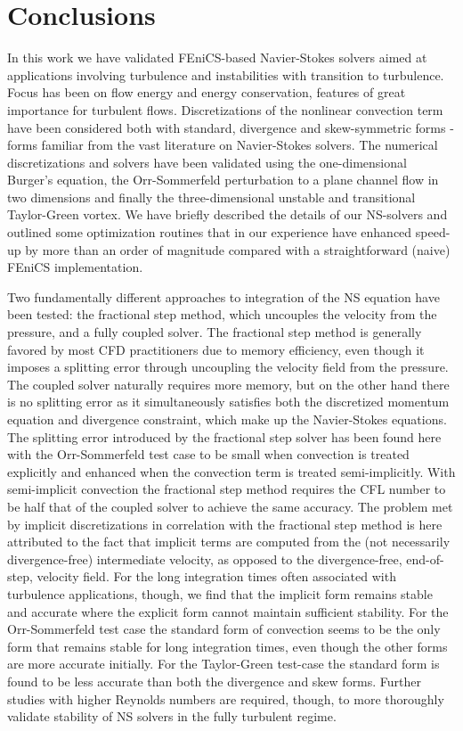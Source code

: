 \section{Conclusions}
In this work we have validated FEniCS-based Navier-Stokes solvers aimed at applications involving turbulence and instabilities with transition to turbulence. Focus has been on flow energy and energy conservation, features of great importance for turbulent flows. Discretizations of the nonlinear convection term have been considered both with standard, divergence and skew-symmetric forms - forms familiar from the vast literature on Navier-Stokes solvers. The numerical discretizations and solvers have been validated using the one-dimensional Burger's equation, the Orr-Sommerfeld perturbation to a plane channel flow in two dimensions and finally the three-dimensional unstable and transitional Taylor-Green vortex. We have briefly described the details of our NS-solvers and outlined some optimization routines that in our experience have enhanced speed-up by more than an order of magnitude compared with a straightforward (naive) FEniCS implementation.

Two fundamentally different approaches to integration of the NS equation have been tested: the fractional step method, which uncouples the velocity from the pressure, and a fully coupled solver. The fractional step method is generally favored by most CFD practitioners due to memory efficiency, even though it imposes a splitting error through uncoupling the velocity field from the pressure. The coupled solver naturally requires more memory, but on the other hand there is no splitting error as it simultaneously satisfies both the discretized momentum equation and divergence constraint, which make up the Navier-Stokes equations. The splitting error introduced by the fractional step solver has been found here with the Orr-Sommerfeld test case to be small when convection is treated explicitly and enhanced when the convection term is treated semi-implicitly. With semi-implicit convection the fractional step method requires the CFL number to be half that of the coupled solver to achieve the same accuracy. The problem met by implicit discretizations in correlation with the fractional step method is here attributed to the fact that implicit terms are computed from the (not necessarily divergence-free) intermediate velocity, as opposed to the divergence-free, end-of-step, velocity field. For the long integration times often associated with turbulence applications, though, we find that the implicit form remains stable and accurate where the explicit form cannot maintain sufficient stability. For the Orr-Sommerfeld test case the standard form of convection seems to be the only form that remains stable for long integration times, even though the other forms are more accurate initially. For the Taylor-Green test-case the standard form is found to be less accurate than both the divergence and skew forms. Further studies with higher Reynolds numbers are required, though, to more thoroughly validate stability of NS solvers in the fully turbulent regime.
